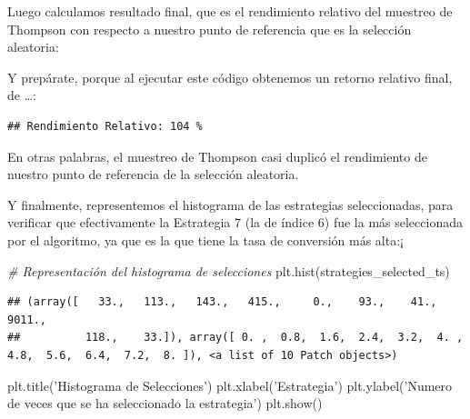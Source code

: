 \documentclass[]{book}
\newenvironment{Shaded}{\begin{snugshade}}{\end{snugshade}}
\newcommand{\BuiltInTok}[1]{#1}
\newcommand{\CommentTok}[1]{\textcolor[rgb]{0.56,0.35,0.01}{\textit{#1}}}
\newcommand{\DecValTok}[1]{\textcolor[rgb]{0.00,0.00,0.81}{#1}}
\newcommand{\NormalTok}[1]{#1}
\newcommand{\OperatorTok}[1]{\textcolor[rgb]{0.81,0.36,0.00}{\textbf{#1}}}
\newcommand{\SpecialCharTok}[1]{\textcolor[rgb]{0.00,0.00,0.00}{#1}}
\newcommand{\StringTok}[1]{\textcolor[rgb]{0.31,0.60,0.02}{#1}}
\begin{document}
Luego calculamos resultado final, que es el rendimiento relativo del muestreo de Thompson con respecto a nuestro punto de referencia que es la selección aleatoria:

\begin{Shaded}
\end{Shaded}

Y prepárate, porque al ejecutar este código obtenemos un retorno relativo final, de \ldots{}:

\begin{verbatim}
## Rendimiento Relativo: 104 %
\end{verbatim}

En otras palabras, el muestreo de Thompson casi duplicó el rendimiento de nuestro punto de referencia de la selección aleatoria.

Y finalmente, representemos el histograma de las estrategias seleccionadas, para verificar que efectivamente la Estrategia 7 (la de índice 6) fue la más seleccionada por el algoritmo, ya que es la que tiene la tasa de conversión más alta:¡

\begin{Shaded}
\begin{Highlighting}[]
\CommentTok{# Representación del histograma de selecciones}
\NormalTok{plt.hist(strategies_selected_ts)}
\end{Highlighting}
\end{Shaded}

\begin{verbatim}
## (array([   33.,   113.,   143.,   415.,     0.,    93.,    41.,  9011.,
##          118.,    33.]), array([ 0. ,  0.8,  1.6,  2.4,  3.2,  4. ,  4.8,  5.6,  6.4,  7.2,  8. ]), <a list of 10 Patch objects>)
\end{verbatim}

\begin{Shaded}
\begin{Highlighting}[]
\NormalTok{plt.title(}\StringTok{'Histograma de Selecciones'}\NormalTok{)}
\NormalTok{plt.xlabel(}\StringTok{'Estrategia'}\NormalTok{)}
\NormalTok{plt.ylabel(}\StringTok{'Numero de veces que se ha seleccionado la estrategia'}\NormalTok{)}
\NormalTok{plt.show()}
\end{Highlighting}
\end{Shaded}
\end{document}
